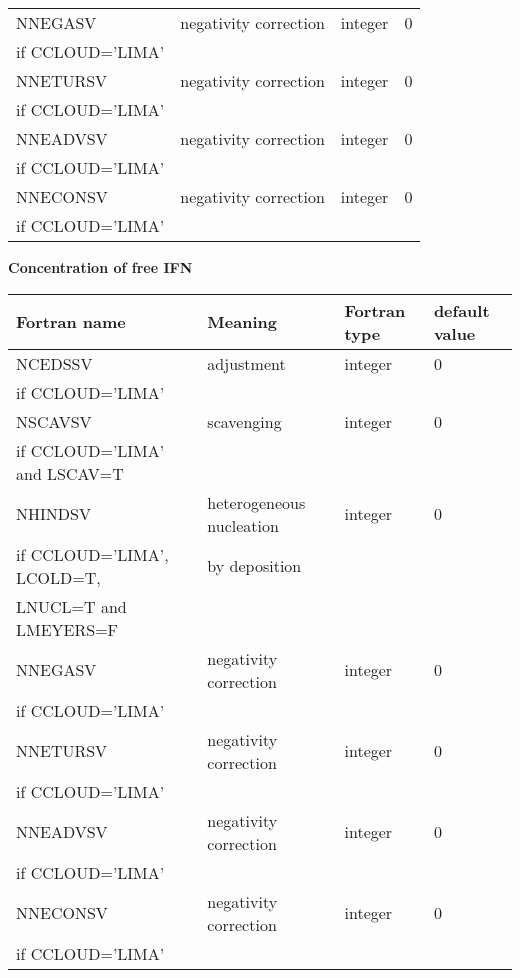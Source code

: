 \begin{longtable} {|p{}|p{}|>{\centering}p{}|p{}<{\centering}|}
NNEGASV   & negativity correction & integer  &  0 \\ \nopagebreak
if CCLOUD='LIMA' &&&\\\hline
NNETURSV  &negativity correction   & integer  &  0 \\ \nopagebreak
if CCLOUD='LIMA' &&&\\\hline
NNEADVSV  & negativity correction  & integer  &  0 \\ \nopagebreak
if CCLOUD='LIMA' &&&\\\hline
NNECONSV  &negativity correction    & integer  &  0 \\ \nopagebreak
if CCLOUD='LIMA' &&&\\\hline
\end{longtable}

\textbf{Concentration of free IFN}
\begin{longtable} {|p{}|p{}|>{\centering}p{}|p{}<{\centering}|}
\hline
Fortran name & Meaning & Fortran type & default value \\
\hline \hline
\endhead
NCEDSSV & adjustment & integer & 0 \\ \nopagebreak
if CCLOUD='LIMA' &&& \\\hline

NSCAVSV & scavenging & integer & 0 \\ \nopagebreak
if CCLOUD='LIMA' and LSCAV=T &&& \\\hline

NHINDSV & heterogeneous nucleation & integer & 0 \\ \nopagebreak
if CCLOUD='LIMA', LCOLD=T, &by deposition&& \\ \nopagebreak
LNUCL=T and LMEYERS=F &&& \\\hline

NNEGASV   & negativity correction & integer  &  0 \\ \nopagebreak
if CCLOUD='LIMA' &&&\\\hline
NNETURSV  &negativity correction   & integer  &  0 \\ \nopagebreak
if CCLOUD='LIMA' &&&\\\hline
NNEADVSV  & negativity correction  & integer  &  0 \\ \nopagebreak
if CCLOUD='LIMA' &&&\\\hline
NNECONSV  &negativity correction    & integer  &  0 \\ \nopagebreak
if CCLOUD='LIMA' &&&\\\hline
\end{longtable}

